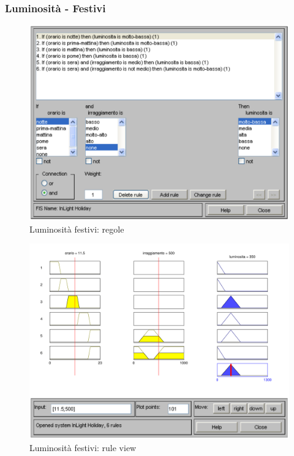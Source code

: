 \subsubsection{Luminosità - Festivi}

\begin{figure}[htbp]
  \centering
  \includegraphics[scale=0.5]{images/fuzzy/luminosita_festivi_regole.pdf}
  \caption{Luminosità festivi: regole}
\end{figure}

\begin{figure}[htbp]
  \centering
  \includegraphics[scale=0.5]{images/fuzzy/luminosita_festivi_rule_view.pdf}
  \caption{Luminosità festivi: rule view}
\end{figure}


